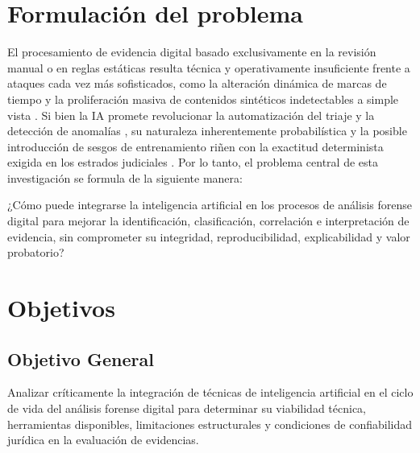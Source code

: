 \documentclass[journal]{IEEEtran}
\begin{document}
\section{Formulación del problema}
El procesamiento de evidencia digital basado exclusivamente en la revisión manual o en reglas estáticas resulta técnica y operativamente insuficiente frente a ataques cada vez más sofisticados, como la alteración dinámica de marcas de tiempo \cite{10.1145/3712716.3712727} y la proliferación masiva de contenidos sintéticos indetectables a simple vista \cite{NevesMiguelJoseDas2025SCFD}. Si bien la IA promete revolucionar la automatización del triaje y la detección de anomalías \cite{SerhalCezar2021Mlba}, su naturaleza inherentemente probabilística y la posible introducción de sesgos de entrenamiento riñen con la exactitud determinista exigida en los estrados judiciales \cite{MaccaroneLeeT.2025IACi}. Por lo tanto, el problema central de esta investigación se formula de la siguiente manera:

¿Cómo puede integrarse la inteligencia artificial en los procesos de análisis forense digital para mejorar la identificación, clasificación, correlación e interpretación de evidencia, sin comprometer su integridad, reproducibilidad, explicabilidad y valor probatorio?

\section{Objetivos}
\subsection{Objetivo General}
Analizar críticamente la integración de técnicas de inteligencia artificial en el ciclo de vida del análisis forense digital para determinar su viabilidad técnica, herramientas disponibles, limitaciones estructurales y condiciones de confiabilidad jurídica en la evaluación de evidencias.
\end{document}
